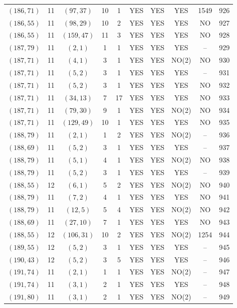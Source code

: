 \begin{longtable}{|c|c|c|c|c|c|c|c|c|c|}
$(186, 71)$ & 11 & $(97, 37)$ & 10 & 1 & YES & YES & YES & 1549 & 926\\
$(186, 55)$ & 11 & $(98, 29)$ & 10 & 2 & YES & YES & YES & NO & 927\\
$(186, 55)$ & 11 & $(159, 47)$ & 11 & 3 & YES & YES & YES & NO & 928\\
$(187, 79)$ & 11 & $(2, 1)$ & 1 & 1 & YES & YES & YES & -- & 929\\
$(187, 71)$ & 11 & $(4, 1)$ & 3 & 1 & YES & YES & NO(2) & NO & 930\\
$(187, 71)$ & 11 & $(5, 2)$ & 3 & 1 & YES & YES & YES & -- & 931\\
$(187, 71)$ & 11 & $(5, 2)$ & 3 & 1 & YES & YES & YES & NO & 932\\
$(187, 71)$ & 11 & $(34, 13)$ & 7 & 17 & YES & YES & YES & NO & 933\\
$(187, 71)$ & 11 & $(79, 30)$ & 9 & 1 & YES & YES & NO(2) & NO & 934\\
$(187, 71)$ & 11 & $(129, 49)$ & 10 & 1 & YES & YES & YES & NO & 935\\
$(188, 79)$ & 11 & $(2, 1)$ & 1 & 2 & YES & YES & NO(2) & -- & 936\\
$(188, 69)$ & 11 & $(5, 2)$ & 3 & 1 & YES & YES & YES & -- & 937\\
$(188, 79)$ & 11 & $(5, 1)$ & 4 & 1 & YES & YES & NO(2) & NO & 938\\
$(188, 79)$ & 11 & $(5, 2)$ & 3 & 1 & YES & YES & YES & -- & 939\\
$(188, 55)$ & 12 & $(6, 1)$ & 5 & 2 & YES & YES & NO(2) & NO & 940\\
$(188, 79)$ & 11 & $(7, 2)$ & 4 & 1 & YES & YES & YES & NO & 941\\
$(188, 79)$ & 11 & $(12, 5)$ & 5 & 4 & YES & YES & NO(2) & NO & 942\\
$(188, 69)$ & 11 & $(27, 10)$ & 7 & 1 & YES & YES & YES & NO & 943\\
$(188, 55)$ & 12 & $(106, 31)$ & 10 & 2 & YES & YES & NO(2) & 1254 & 944\\
$(189, 55)$ & 12 & $(5, 2)$ & 3 & 1 & YES & YES & YES & -- & 945\\
$(190, 43)$ & 12 & $(5, 2)$ & 3 & 5 & YES & YES & YES & -- & 946\\
$(191, 74)$ & 11 & $(2, 1)$ & 1 & 1 & YES & YES & NO(2) & -- & 947\\
$(191, 74)$ & 11 & $(3, 1)$ & 2 & 1 & YES & YES & YES & -- & 948\\
$(191, 80)$ & 11 & $(3, 1)$ & 2 & 1 & YES & YES & NO(2) & -- & 949\\

\end{longtable}
